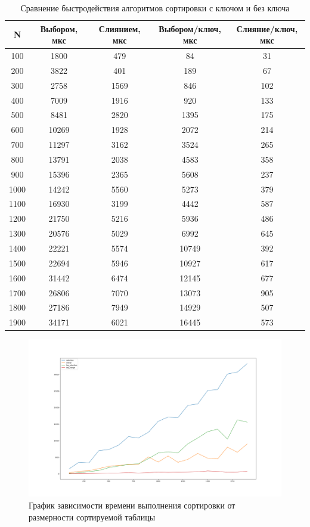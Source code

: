 \begin{table}
	\caption{Сравнение быстродействия алгоритмов сортировки с ключом и без ключа}
	\begin{center}
		\begin{tabular}{|c|c|c|c|c|}
			\hline
			N & Выбором, мкс & Слиянием, мкс & Выбором/ключ, мкс & Слияние/ключ, мкс \\
			\hline
			100 & 1800 & 479 & 84 & 31 \\
			200 & 3822 & 401 & 189 & 67 \\
			300 & 2758 & 1569 & 846 & 102 \\
			400 & 7009 & 1916 & 920 & 133 \\
			500 & 8481 & 2820 & 1395 & 175 \\
			600 & 10269 & 1928 & 2072 & 214 \\
			700 & 11297 & 3162 & 3524 & 265 \\
			800 & 13791 & 2038 & 4583 & 358 \\
			900 & 15396 & 2365 & 5608 & 237 \\
			1000 & 14242 & 5560 & 5273 & 379 \\
			1100 & 16930 & 3199 & 4442 & 587 \\
			1200 & 21750 & 5216 & 5936 & 486 \\
			1300 & 20576 & 5029 & 6992 & 645 \\
			1400 & 22221 & 5574 & 10749 & 392 \\
			1500 & 22694 & 5946 & 10927 & 617 \\
			1600 & 31442 & 6474 & 12145 & 677 \\
			1700 & 26806 & 7070 & 13073 & 905 \\
			1800 & 27186 & 7949 & 14929 & 507 \\
			1900 & 34171 & 6021 & 16445 & 573 \\
			\hline
		\end{tabular}
	\end{center}
\end{table}

\pagebreak

\begin{figure}
	\includegraphics[width=\linewidth]{img/sort_time.png}
	\caption{График зависимости времени выполнения сортировки от размерности сортируемой таблицы}
\end{figure}


